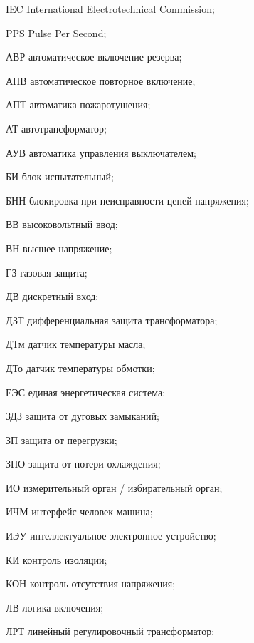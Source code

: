 \begin{list}{}%
{%
  \setlength{\labelwidth}{\abbrwidth}%
  \setlength{\labelsep}{0pt}%
  \setlength{\leftmargin}{\dimexpr\labelwidth+\labelsep\relax}%
  \setlength{\itemindent}{0pt}%
  \setlength{\parsep}{0pt}%
  \setlength{\itemsep}{0pt}
  \renewcommand{\makelabel}[1]{#1 --\hspace{\abbrgap}}%
}
\item[IEC]  International Electrotechnical Commission;
\item[PPS] Pulse Per Second;
\item[АВР] автоматическое включение резерва;
\item[АПВ] автоматическое повторное включение;
\item[АПТ] автоматика пожаротушения;
\item[АТ] автотрансформатор;
\item[АУВ] автоматика управления выключателем;
\item[БИ] блок испытательный;
\item[БНН] блокировка при неисправности цепей напряжения;
\item[ВВ] высоковольтный ввод;
\item[ВН] высшее напряжение;
\item[ГЗ] газовая защита;
\item[ДВ] дискретный вход;
\item[ДЗТ] дифференциальная защита трансформатора;
\item[ДТм] датчик температуры масла;
\item[ДТо] датчик температуры обмотки;
\item[ЕЭС] единая энергетическая система;
\item[ЗДЗ] защита от дуговых замыканий;
\item[ЗП] защита от перегрузки;
\item[ЗПО] защита от потери охлаждения;
\item[ИО] измерительный орган / избирательный орган;
\item[ИЧМ] интерфейс человек-машина;
\item[ИЭУ] интеллектуальное электронное устройство;
\item[КИ] контроль изоляции;
\item[КОН] контроль отсутствия напряжения;
\item[ЛВ] логика включения;
\item[ЛРТ] линейный регулировочный трансформатор;

\end{list}
